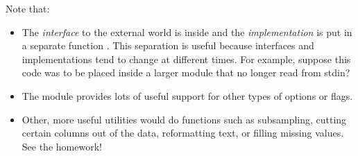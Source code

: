 Note that:
\begin{itemize}
  \item The \emph{interface} to the external world is inside  and the \emph{implementation} is put in a separate function .  This separation is useful because interfaces and implementations tend to change at different times.  For example, suppose this code was to be placed inside a larger module that no longer read from stdin?
  \item The  module provides lots of useful support for other types of options or flags.
  \item Other, more useful utilities would do functions such as subsampling, cutting certain columns out of the data, reformatting text, or filling missing values.  See the homework!
\end{itemize}
